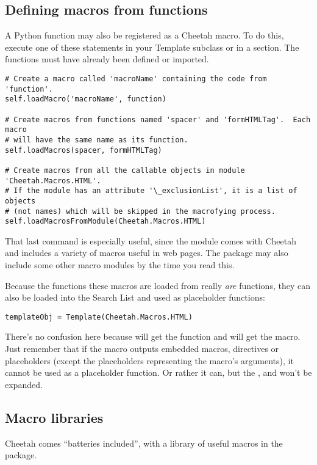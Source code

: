 

\subsection{Defining macros from functions}

A Python function may also be registered as a Cheetah macro.  To do this,
execute one of these statements in your Template subclass or in a 
 section.  The functions must have already been defined or 
imported.

\begin{verbatim}
# Create a macro called 'macroName' containing the code from 'function'.
self.loadMacro('macroName', function)

# Create macros from functions named 'spacer' and 'formHTMLTag'.  Each macro
# will have the same name as its function.
self.loadMacros(spacer, formHTMLTag)

# Create macros from all the callable objects in module 'Cheetah.Macros.HTML'.
# If the module has an attribute '\_exclusionList', it is a list of objects
# (not names) which will be skipped in the macrofying process.
self.loadMacrosFromModule(Cheetah.Macros.HTML)
\end{verbatim}

That last command is especially useful, since the 
module comes with Cheetah and includes a variety of macros useful in web
pages.  The  package may also include some other macro
modules by the time you read this.

Because the functions these macros are loaded from really {\em are} functions,
they can also be loaded into the Search List and used as placeholder functions:

\begin{verbatim}
templateObj = Template(Cheetah.Macros.HTML)
\end{verbatim}

There's no confusion here because  will get the function and
 will get the macro.  Just remember that if the macro
outputs embedded macros, directives or placeholders (except the placeholders
representing the macro's arguments), it cannot be used as a placeholder
function.  Or rather it can, but the ,  and 
won't be expanded.


\subsection{Macro libraries}
\label{macros.libraries}

Cheetah comes ``batteries included'', with a library of useful macros in the
 package.  
